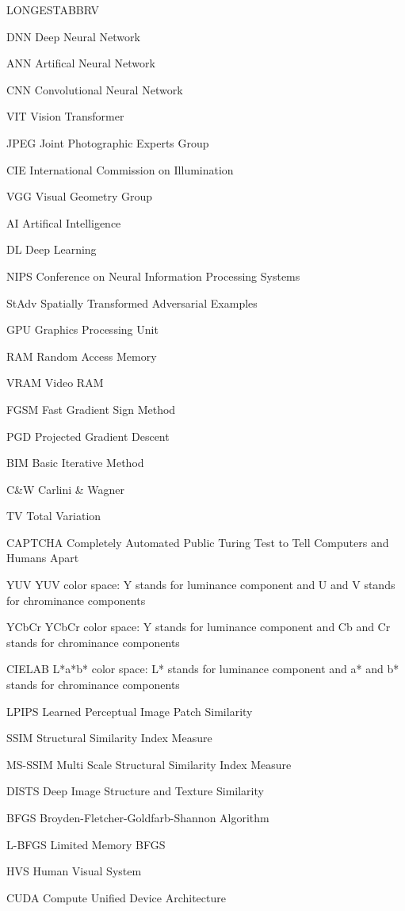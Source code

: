 \begin{theglossary}{LONGESTABBRV}

    \item[DNN] Deep Neural Network
    \item[ANN] Artifical Neural Network
    \item[CNN] Convolutional Neural Network
    \item[VIT] Vision Transformer
    \item[JPEG] Joint Photographic Experts Group
    \item[CIE] International Commission on Illumination
    \item[VGG] Visual Geometry Group
    \item[AI] Artifical Intelligence
    \item[DL] Deep Learning
    \item[NIPS] Conference on Neural Information Processing Systems
    \item[StAdv] Spatially Transformed Adversarial Examples
    \item[GPU] Graphics Processing Unit
    \item[RAM] Random Access Memory
    \item[VRAM] Video RAM
    \item[FGSM] Fast Gradient Sign Method
    \item[PGD] Projected Gradient Descent
    \item[BIM] Basic Iterative Method
    \item[C\&W] Carlini \& Wagner
    \item[TV] Total Variation
    \item[CAPTCHA] Completely Automated Public Turing Test to Tell Computers and Humans Apart
    \item[YUV] YUV color space: Y stands for luminance component and U and V stands for chrominance components
    \item[YCbCr] YCbCr color space: Y stands for luminance component and Cb and Cr stands for chrominance components
    \item[CIELAB] L*a*b* color space: L* stands for luminance component and a* and b* stands for chrominance components
    \item[LPIPS] Learned Perceptual Image Patch Similarity
    \item[SSIM] Structural Similarity Index Measure
    \item[MS-SSIM] Multi Scale Structural Similarity Index Measure
    \item[DISTS] Deep Image Structure and Texture Similarity
    \item[BFGS] Broyden-Fletcher-Goldfarb-Shannon Algorithm
    \item[L-BFGS] Limited Memory BFGS
    \item[HVS] Human Visual System
    \item[CUDA] Compute Unified Device Architecture


\end{theglossary}
